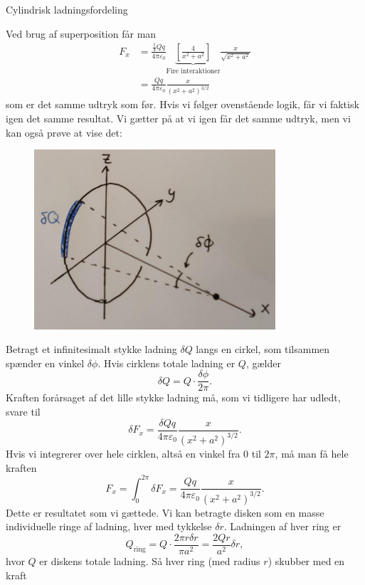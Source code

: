 \begin{opgave}{Cylindrisk ladningsfordeling}
\begin{figure}[H]
    \end{figure}
    Ved brug af superposition får man
    \begin{align*}
        F_x&=\frac{\frac{1}{4}Qq}{4\pi\varepsilon_0}\underbrace{\left[\frac{4}{x^2+a^2}\right]}_{\text{Fire interaktioner}}\frac{x}{\sqrt{x^2+a^2}}\\
        &=\frac{Qq}{4\pi\varepsilon_0}\frac{x}{(x^2+a^2)^{3/2}}
    \end{align*}
    som er det samme udtryk som før.
    \opg Hvis vi følger ovenstående logik, får vi faktisk igen det samme resultat.
    \opg Vi gætter på at vi igen får det samme udtryk, men vi kan også prøve at vise det:
    \begin{figure}[H]
        \centering
        \includegraphics[width=0.8\textwidth]{facit/figurer/elektro/elektro_opg10,7.jpg}
    \end{figure}
    Betragt et infinitesimalt stykke ladning $\delta Q$ langs en cirkel, som tilsammen spænder en vinkel $\delta\phi$. Hvis cirklens totale ladning er $Q$, gælder
    \[ \delta Q=Q\cdot \frac{\delta \phi}{2\pi}. \]
    Kraften forårsaget af det lille stykke ladning må, som vi tidligere har udledt, svare til
    \[ \delta F_x=\frac{\delta Q q}{4\pi\varepsilon_0}\frac{x}{(x^2+a^2)^{3/2}}. \]
    Hvis vi integrerer over hele cirklen, altså en vinkel fra 0 til $2\pi$, må man få hele kraften
    \[ F_x=\int_0^{2\pi}\delta F_x=\frac{Qq}{4\pi\varepsilon_0}\frac{x}{(x^2+a^2)^{3/2}}. \]
    Dette er resultatet som vi gættede.
    \opg Vi kan betragte disken som en masse individuelle ringe af ladning, hver med tykkelse $\delta r$. Ladningen af hver ring er
    \[ Q_\text{ring}=Q\cdot\frac{2\pi r\delta r}{\pi a^2}=\frac{2Qr}{a^2}\delta r, \]
    hvor $Q$ er diskens totale ladning. Så hver ring (med radius $r$) skubber med en kraft
    \begin{align*}

\end{align*}
\end{opgave}
